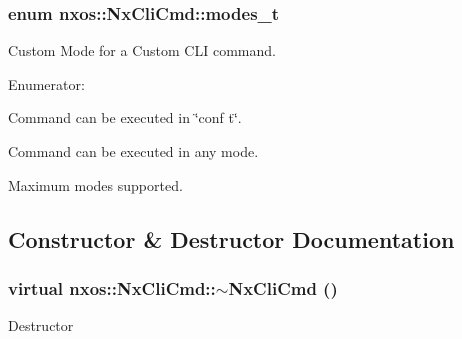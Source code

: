 \hypertarget{classnxos_1_1NxCliCmd_a72999b2e8f2995bbb19be346d875e3ce}{
\subsubsection[{modes\_\-t}]{\setlength{\rightskip}{0pt plus 5cm}enum {\bf nxos::NxCliCmd::modes\_\-t}}}
\label{classnxos_1_1NxCliCmd_a72999b2e8f2995bbb19be346d875e3ce}


Custom Mode for a Custom CLI command. \begin{Desc}
\item[Enumerator: ]\par
\begin{description}
\item[{\em 
\hypertarget{classnxos_1_1NxCliCmd_a72999b2e8f2995bbb19be346d875e3cea5f01458d92031d6ca875f201bd8d0bb1}{
CONF\_\-MODE}
\label{classnxos_1_1NxCliCmd_a72999b2e8f2995bbb19be346d875e3cea5f01458d92031d6ca875f201bd8d0bb1}
}]Command can be executed in \char`\"{}conf t\char`\"{}. \item[{\em 
\hypertarget{classnxos_1_1NxCliCmd_a72999b2e8f2995bbb19be346d875e3cea9213e9b4feb7ead0d2333bc83bfc5cdb}{
EXEC\_\-MODE}
\label{classnxos_1_1NxCliCmd_a72999b2e8f2995bbb19be346d875e3cea9213e9b4feb7ead0d2333bc83bfc5cdb}
}]Command can be executed in any mode. \item[{\em 
\hypertarget{classnxos_1_1NxCliCmd_a72999b2e8f2995bbb19be346d875e3ceaedb25d06f68762ba3a8c8bc831a14c6f}{
MAX\_\-MODE}
\label{classnxos_1_1NxCliCmd_a72999b2e8f2995bbb19be346d875e3ceaedb25d06f68762ba3a8c8bc831a14c6f}
}]Maximum modes supported. \end{description}
\end{Desc}



\subsection{Constructor \& Destructor Documentation}
\hypertarget{classnxos_1_1NxCliCmd_a3678e859df1bd42824f5b9f9f1de3b08}{
\subsubsection[{$\sim$NxCliCmd}]{\setlength{\rightskip}{0pt plus 5cm}virtual nxos::NxCliCmd::$\sim$NxCliCmd ()}}
\label{classnxos_1_1NxCliCmd_a3678e859df1bd42824f5b9f9f1de3b08}
Destructor 

